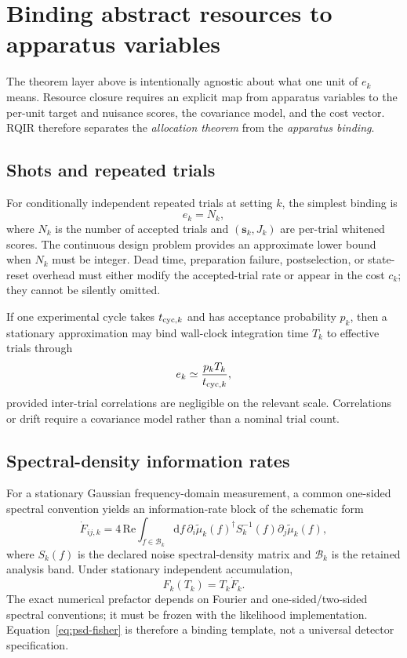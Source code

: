 \section{Binding abstract resources to apparatus variables}
\label{sec:physical-binding}

The theorem layer above is intentionally agnostic about what one unit of $e_k$ means. Resource closure requires an explicit map from apparatus variables to the per-unit target and nuisance scores, the covariance model, and the cost vector. RQIR therefore separates the \emph{allocation theorem} from the \emph{apparatus binding}.

\subsection{Shots and repeated trials}

For conditionally independent repeated trials at setting $k$, the simplest binding is
\begin{equation}
 e_k=N_k,
\end{equation}
where $N_k$ is the number of accepted trials and $(\bm s_k,J_k)$ are per-trial whitened scores. The continuous design problem provides an approximate lower bound when $N_k$ must be integer. Dead time, preparation failure, postselection, or state-reset overhead must either modify the accepted-trial rate or appear in the cost $c_k$; they cannot be silently omitted.

If one experimental cycle takes $t_{{\rm cyc},k}$ and has acceptance probability $p_k$, then a stationary approximation may bind wall-clock integration time $T_k$ to effective trials through
\begin{equation}
 e_k\simeq
 \frac{p_k T_k}{t_{{\rm cyc},k}},
\label{eq:shot-rate}
\end{equation}
provided inter-trial correlations are negligible on the relevant scale. Correlations or drift require a covariance model rather than a nominal trial count.

\subsection{Spectral-density information rates}

For a stationary Gaussian frequency-domain measurement, a common one-sided spectral convention yields an information-rate block of the schematic form
\begin{equation}
 \dot F_{ij,k}
 =
 4\,\mathrm{Re}\int_{f\in\mathcal B_k}
 \mathrm df\,
 \partial_i\tilde\mu_k(f)^\dagger
 S_k^{-1}(f)
 \partial_j\tilde\mu_k(f),
\label{eq:psd-fisher}
\end{equation}
where $S_k(f)$ is the declared noise spectral-density matrix and
$\mathcal B_k$ is the retained analysis band. Under stationary independent accumulation,
\begin{equation}
 F_k(T_k)=T_k\dot F_k.
\end{equation}
The exact numerical prefactor depends on Fourier and one-sided/two-sided spectral conventions; it must be frozen with the likelihood implementation. Equation~\eqref{eq:psd-fisher} is therefore a binding template, not a universal detector specification.

